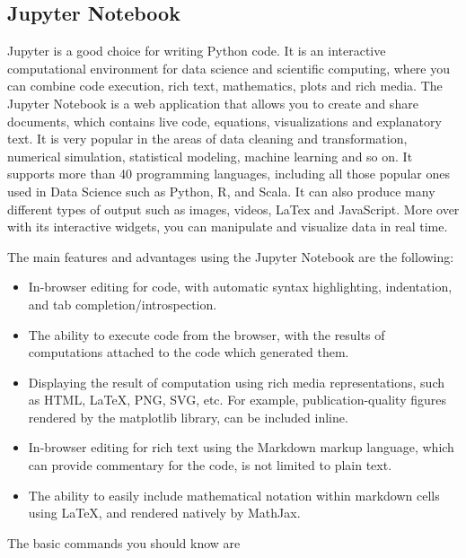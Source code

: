 \subsection{Jupyter Notebook}

Jupyter is a good choice for writing Python code. It is an interactive computational environment for data science and scientific computing, where you can combine code execution, rich text, mathematics, plots and rich media. The Jupyter Notebook is a web application that allows you to create and share documents, which contains live code, equations, visualizations and explanatory text. It is very popular in the areas of data cleaning and transformation, numerical simulation, statistical modeling, machine learning and so on. It supports more than 40 programming languages, including all those popular ones used in Data Science such as Python, R, and Scala. It can also produce many different types of output such as images, videos, LaTex and JavaScript. More over with its interactive widgets, you can manipulate and visualize data in real time.

\noindent The main features and advantages using the Jupyter Notebook are the
following:

\begin{itemize}

\item In-browser editing for code, with automatic syntax highlighting, indentation, and tab completion/introspection.

\item The ability to execute code from the browser, with the results of computations attached to the code which generated them.

\item Displaying the result of computation using rich media representations, such as HTML, LaTeX, PNG, SVG, etc. For example, publication-quality figures rendered by the matplotlib library, can be included inline.

\item In-browser editing for rich text using the Markdown markup language, which can provide commentary for the code, is not limited to plain text.

\item The ability to easily include mathematical notation within markdown cells using LaTeX, and rendered natively by MathJax.

\end{itemize}

\noindent The basic commands you should know are

